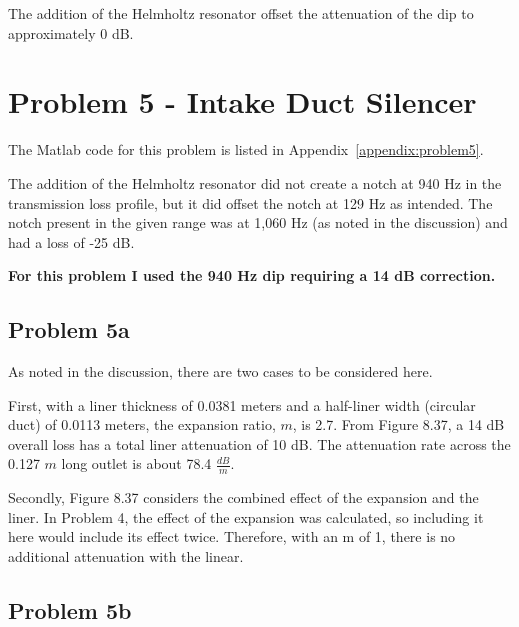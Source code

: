 {{{{The addition of the Helmholtz resonator offset the attenuation of the dip to approximately 0 dB.










\newpage
\section*{Problem 5 - Intake Duct Silencer}

The Matlab code for this problem is listed in Appendix~\ref{appendix:problem5}.

\vspace{0.25cm}
The addition of the Helmholtz resonator did not create a notch at 940 Hz in the transmission loss profile, but it did offset the notch at 129 Hz as intended.  The notch present in the given range was at 1,060 Hz (as noted in the discussion) and had a loss of -25 dB.

\vspace{0.25cm}
\textbf{For this problem I used the 940 Hz dip requiring a 14 dB correction.}


\subsection*{Problem 5a}

As noted in the discussion, there are two cases to be considered here.

\vspace{0.25cm}
First, with a liner thickness of 0.0381 meters and a half-liner width (circular duct) of 0.0113 meters, the expansion ratio, $m$, is 2.7.  From Figure 8.37, a 14 dB overall loss has a total liner attenuation of 10 dB.  The attenuation rate across the 0.127 $m$ long outlet is about 78.4 $\frac{dB}{m}$.

\vspace{0.25cm}
Secondly, Figure 8.37 considers the combined effect of the expansion and the liner.  In Problem 4, the effect of the expansion was calculated, so including it here would include its effect twice.  Therefore, with an m of 1, there is no additional attenuation with the linear.



\subsection*{Problem 5b}

}}}}
